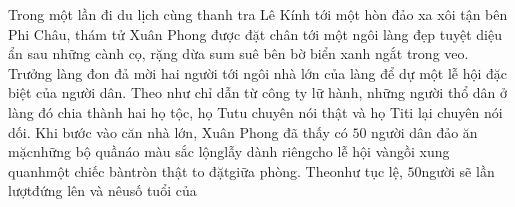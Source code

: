 \begin{multicols}{2}
	 Trong một lần đi du lịch cùng thanh tra Lê Kính tới một hòn đảo xa xôi tận bên Phi Châu, thám tử Xuân Phong được đặt chân tới một ngôi làng đẹp tuyệt diệu ẩn sau những cành cọ, rặng dừa sum suê bên bờ biển xanh ngắt trong veo. Trưởng làng đon đả mời hai người tới ngôi nhà lớn của làng để dự một lễ hội đặc biệt của người dân. Theo như chỉ dẫn từ công ty lữ hành, những người thổ dân ở làng đó chia thành hai họ tộc, họ Tutu chuyên nói thật và họ Titi lại chuyên nói dối. Khi bước vào căn nhà lớn, Xuân Phong đã thấy có $50$ người dân đảo ăn mặc\hspace*{123pt}\linebreak[6]những bộ quần\hspace*{123pt}\linebreak[6]áo màu sắc lộng\hspace*{123pt}\linebreak[6]lẫy dành riêng\hspace*{123pt}\linebreak[6]cho lễ hội và\hspace*{123pt}\linebreak[6]ngồi xung quanh\hspace*{123pt}\linebreak[6]một chiếc bàn\hspace*{123pt}\linebreak[6]tròn thật to đặt\hspace*{123pt}\linebreak[6]giữa phòng. Theo\hspace*{123pt}\linebreak[6]như tục lệ, $50$\hspace*{123pt}\linebreak[6]người sẽ lần lượt\hspace*{123pt}\linebreak[6]đứng lên và nêu\hspace*{123pt}\linebreak[6]số tuổi của 
\end{multicols}

